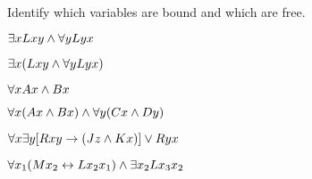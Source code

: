 %
%
%
%


\practiceproblems
\problempart
\label{pr.freeFOL}
Identify which variables are bound and which are free.
\begin{earg}
\item $\exists x Lxy \wedge \forall y Lyx$
\item $\exists x (Lxy \wedge \forall y Lyx)$
\item $\forall x Ax \wedge Bx$
\item $\forall x (Ax \wedge Bx) \wedge \forall y(Cx \wedge Dy)$
\item $\forall x\exists y[Rxy \rightarrow (Jz \wedge Kx)] \vee Ryx$
\item $\forall x_1(Mx_2 \leftrightarrow Lx_2x_1) \wedge \exists x_2 Lx_3x_2$
\end{earg}

